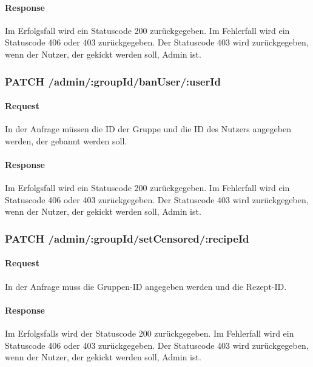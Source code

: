 \documentclass{entwurfsheft}
\begin{document}
\begin{sloppypar}
\paragraph{Response}
Im Erfolgsfall wird ein Statuscode 200 zurückgegeben.
Im Fehlerfall wird ein Statuscode 406 oder 403 zurückgegeben. Der Statuscode 403 wird zurückgegeben, wenn der Nutzer, der gekickt werden soll, Admin ist.

\subsubsection*{PATCH /admin/:groupId/banUser/:userId}
\paragraph{Request}
In der Anfrage müssen die ID der Gruppe und die ID des Nutzers angegeben werden, der gebannt werden soll.
\paragraph{Response}
Im Erfolgsfall wird ein Statuscode 200 zurückgegeben.
Im Fehlerfall wird ein Statuscode 406 oder 403 zurückgegeben. Der Statuscode 403 wird zurückgegeben, wenn der Nutzer, der gekickt werden soll, Admin ist.
\subsubsection*{PATCH /admin/:groupId/setCensored/:recipeId}
    \paragraph{Request}
        In der Anfrage muss die Gruppen-ID angegeben werden und die Rezept-ID.
    \paragraph{Response}
        Im Erfolgsfalls wird der Statuscode 200 zurückgegeben.
        Im Fehlerfall wird ein Statuscode 406 oder 403 zurückgegeben. Der Statuscode 403 wird zurückgegeben, wenn der Nutzer, der gekickt werden soll, Admin ist.
\newpage


\end{sloppypar}
\end{document}
